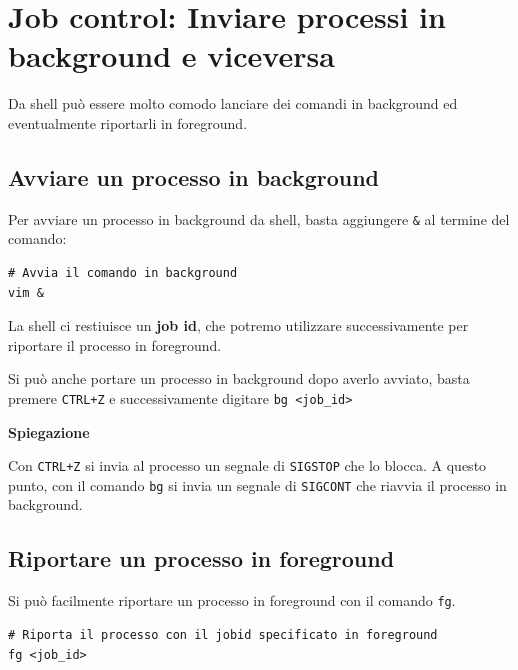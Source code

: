 \documentclass[a4paper]{report}
\newenvironment{info}{\begin{tcolorbox}[fonttitle=\sffamily\bfseries\large,title=Info,colframe=blue!75!white]}{\end{tcolorbox}}
\newenvironment{code}{\begin{tcolorbox}[size=small]}{\end{tcolorbox}}
\begin{document}
\section{Job control: Inviare processi in background e viceversa}

Da shell può essere molto comodo lanciare dei comandi in background ed eventualmente riportarli in foreground.

\subsection{Avviare un processo in background}

Per avviare un processo in background da shell, basta aggiungere \texttt{\&} al termine del comando:

\begin{code} 
\begin{lstlisting}
# Avvia il comando in background
vim &
\end{lstlisting}
\end{code}

La shell ci restiuisce un \textbf{job id}, che potremo utilizzare successivamente per riportare il processo in foreground.

\begin{info}
	Si può anche portare un processo in background dopo averlo avviato, basta premere \texttt{CTRL+Z} e successivamente digitare \texttt{bg <job\_id>}
	
	\vspace{2mm}
	\textbf{Spiegazione}
	
	Con \texttt{CTRL+Z} si invia al processo un segnale di \texttt{SIGSTOP} che lo blocca. A questo punto, con il comando \texttt{bg} si invia un segnale di \texttt{SIGCONT} che riavvia il processo in background.	
\end{info}

\subsection{Riportare un processo in foreground}

Si può facilmente riportare un processo in foreground con il comando \texttt{fg}.

\begin{code} 
\begin{lstlisting}
# Riporta il processo con il jobid specificato in foreground
fg <job_id>
\end{lstlisting}
\end{code}
\end{document}
